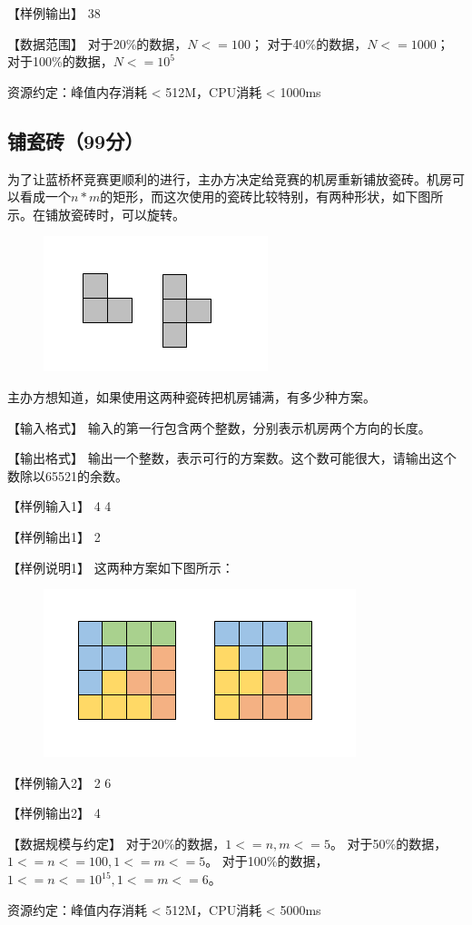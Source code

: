 \documentclass[a4paper, 12pt, twocolumn]{ctexart}
\begin{document}
	【样例输出】
	38
	
	【数据范围】
	对于20\%的数据，$N<=100$；
	对于40\%的数据，$N<=1000$；
	对于100\%的数据，$N<=10^5$
	
	资源约定：峰值内存消耗 < 512M，CPU消耗  < 1000ms
	
	\subsection{铺瓷砖（99分）}
	
	为了让蓝桥杯竞赛更顺利的进行，主办方决定给竞赛的机房重新铺放瓷砖。机房可以看成一个$n*m$的矩形，而这次使用的瓷砖比较特别，有两种形状，如下图所示。在铺放瓷砖时，可以旋转。
	
	\begin{figure}[H]
		\centering
		\includegraphics[width=.8\linewidth]{005.png}
	\end{figure}
	
	主办方想知道，如果使用这两种瓷砖把机房铺满，有多少种方案。
	
	【输入格式】
	输入的第一行包含两个整数，分别表示机房两个方向的长度。
	
	【输出格式】
	输出一个整数，表示可行的方案数。这个数可能很大，请输出这个数除以65521的余数。
	
	【样例输入1】
	4 4
	
	【样例输出1】
	2
	
	【样例说明1】
	这两种方案如下图所示：
	
	\begin{figure}[H]
		\centering
		\includegraphics[width=.8\linewidth]{006.png}
	\end{figure}
	
	【样例输入2】
	2 6
	
	【样例输出2】
	4
	
	【数据规模与约定】
	对于20\%的数据，$1<=n, m<=5$。
	对于50\%的数据，$1<=n<=100,1<=m<=5$。
	对于100\%的数据，$1<=n<=10^{15},1<=m<=6$。
	
	资源约定：峰值内存消耗 < 512M，CPU消耗  < 5000ms
	
\end{document}
